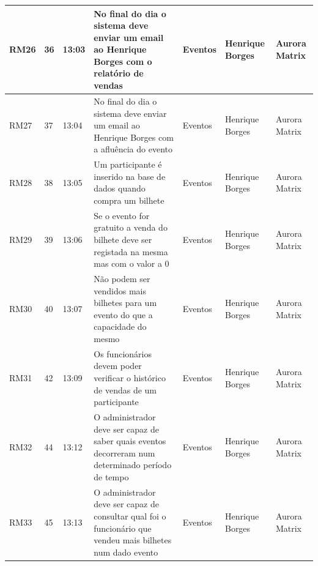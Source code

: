 \documentclass[a4paper,12pt]{scrreprt}
\begin{document}
\begin{table}[!ht]
{\begin{tabular}{|l|l|l|l|l|l|l|}
        RM26 & 36 & 13:03 & No final do dia o sistema deve enviar um email ao Henrique Borges com o relatório de vendas & Eventos & Henrique Borges & Aurora Matrix \\ \hline
        RM27 & 37 & 13:04 & No final do dia o sistema deve enviar um email ao Henrique Borges com a afluência do evento & Eventos & Henrique Borges & Aurora Matrix \\ \hline
        RM28 & 38 & 13:05 & Um participante é inserido na base de dados quando compra um bilhete & Eventos & Henrique Borges & Aurora Matrix \\ \hline
        RM29 & 39 & 13:06 & Se o evento for gratuito a venda do bilhete deve ser registada na mesma mas com o valor a 0 & Eventos & Henrique Borges & Aurora Matrix \\ \hline
        RM30 & 40 & 13:07 & Não podem ser vendidos mais bilhetes para um evento do que a capacidade do mesmo & Eventos & Henrique Borges & Aurora Matrix \\ \hline
        RM31 & 42 & 13:09 & Os funcionários devem poder verificar o histórico de vendas de um participante & Eventos & Henrique Borges & Aurora Matrix \\ \hline
        RM32 & 44 & 13:12 & O administrador deve ser capaz de saber quais eventos decorreram num determinado período de tempo & Eventos & Henrique Borges & Aurora Matrix \\ \hline
        RM33 & 45 & 13:13 & O administrador deve ser capaz de consultar qual foi o funcionário que vendeu mais bilhetes num dado evento & Eventos & Henrique Borges & Aurora Matrix \\ \hline
    \end{tabular}%
}
\end{table}
        \newpage
\end{document}
